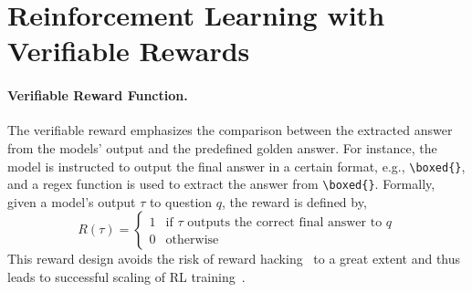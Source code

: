 \documentclass{article}
\begin{document}
\section{Reinforcement Learning with Verifiable Rewards}


\paragraph{Verifiable Reward Function.} 
The verifiable reward emphasizes the comparison between the extracted answer from the models' output and the predefined golden answer. For instance, the model is instructed to output the final answer in a certain format, e.g., \verb|\boxed{}|, and a regex function is used to extract the answer from \verb|\boxed{}|. Formally, given a model's output $\tau$ to question $q$, the reward is defined by, 
\begin{equation}
    R(\tau) = 
    \begin{cases} 
        1 & \text{if } {\tau} \text{ outputs the correct final answer to } {q} \\
        0 & \text{otherwise}
    \end{cases}
\end{equation}
This reward design avoids the risk of reward hacking~\cite{hacking1,hacking2,hacking3} to a great extent and thus leads to successful scaling of RL training~\cite{r1}. 
\end{document}
